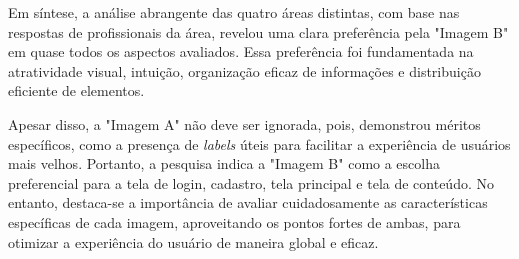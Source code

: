 Em síntese, a análise abrangente das quatro áreas distintas, com base nas respostas de profissionais da área, revelou uma clara preferência pela "Imagem B" em quase todos os aspectos avaliados. Essa preferência foi fundamentada na atratividade visual, intuição, organização eficaz de informações e distribuição eficiente de elementos.

Apesar disso, a "Imagem A" não deve ser ignorada, pois, demonstrou méritos específicos, como a presença de \textit{labels} úteis para facilitar a experiência de usuários mais velhos. Portanto, a pesquisa indica a "Imagem B" como a escolha preferencial para a tela de login, cadastro, tela principal e tela de conteúdo. No entanto, destaca-se a importância de avaliar cuidadosamente as características específicas de cada imagem, aproveitando os pontos fortes de ambas, para otimizar a experiência do usuário de maneira global e eficaz.






